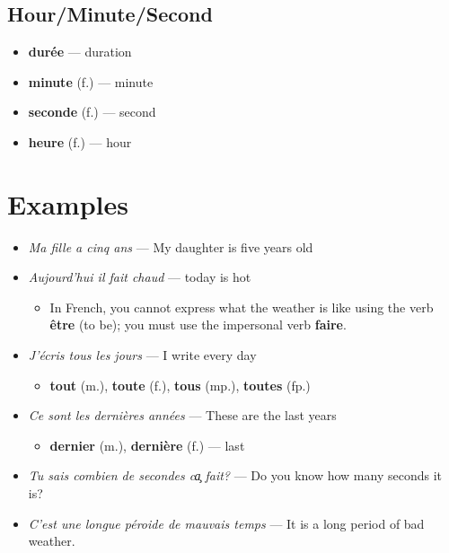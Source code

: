 \documentclass[a4paper,12pt]{article}
\begin{document}
\subsection{Hour/Minute/Second}
\begin{itemize}
	\item \textbf{dur\'ee} --- duration
	\item \textbf{minute} (f.) --- minute
	\item \textbf{seconde} (f.) --- second
	\item \textbf{heure} (f.) --- hour
\end{itemize}
	
\section{Examples}
\begin{itemize}
	\item \textit{Ma fille a cinq ans} --- My daughter is five years old
	\item \textit{Aujourd'hui il fait chaud} --- today is hot
	\begin{itemize}
		\item In French, you cannot express what the weather is like using the verb \textbf{\^etre} (to be); you must use the impersonal verb \textbf{faire}.
	\end{itemize}
	\item \textit{J'\'ecris tous les jours} --- I write every day
	\begin{itemize}
		\item \textbf{tout} (m.), \textbf{toute} (f.), \textbf{tous} (mp.), \textbf{toutes} (fp.)
	\end{itemize}
	\item \textit{Ce sont les derni\`eres ann\'ees} --- These are the last years
	\begin{itemize}
		\item \textbf{dernier} (m.), \textbf{derni\`ere} (f.) --- last
	\end{itemize}
	\item \textit{Tu sais combien de secondes c\c a fait?} --- Do you know how many seconds it is?
	\item \textit{C'est une longue p\'eroide de mauvais temps} --- It is a long period of bad weather.
\end{itemize}
\end{document}
